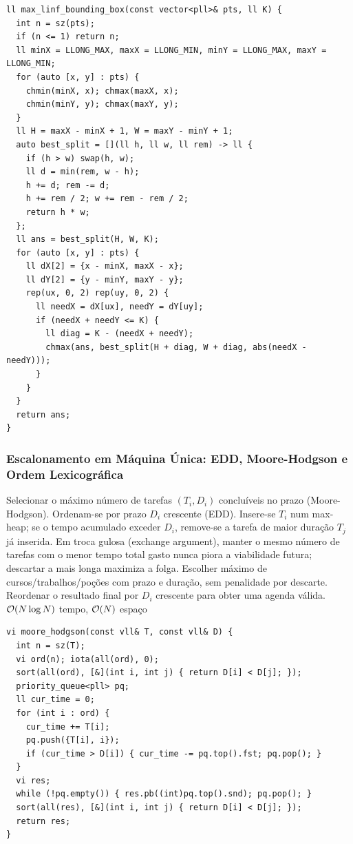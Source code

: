 \begin{lstlisting}
ll max_linf_bounding_box(const vector<pll>& pts, ll K) {
  int n = sz(pts);
  if (n <= 1) return n;
  ll minX = LLONG_MAX, maxX = LLONG_MIN, minY = LLONG_MAX, maxY = LLONG_MIN;
  for (auto [x, y] : pts) {
    chmin(minX, x); chmax(maxX, x);
    chmin(minY, y); chmax(maxY, y);
  }
  ll H = maxX - minX + 1, W = maxY - minY + 1;
  auto best_split = [](ll h, ll w, ll rem) -> ll {
    if (h > w) swap(h, w);
    ll d = min(rem, w - h);
    h += d; rem -= d;
    h += rem / 2; w += rem - rem / 2;
    return h * w;
  };
  ll ans = best_split(H, W, K);
  for (auto [x, y] : pts) {
    ll dX[2] = {x - minX, maxX - x};
    ll dY[2] = {y - minY, maxY - y};
    rep(ux, 0, 2) rep(uy, 0, 2) {
      ll needX = dX[ux], needY = dY[uy];
      if (needX + needY <= K) {
        ll diag = K - (needX + needY);
        chmax(ans, best_split(H + diag, W + diag, abs(needX - needY)));
      }
    }
  }
  return ans;
}
\end{lstlisting}

\subsubsection{Escalonamento em Máquina Única: EDD, Moore-Hodgson e Ordem Lexicográfica}
\algobox
  {Selecionar o máximo número de tarefas $(T_i, D_i)$ concluíveis no prazo (Moore-Hodgson).}
  {Ordenam-se por prazo $D_i$ crescente (EDD). Insere-se $T_i$ num max-heap; se o tempo acumulado exceder $D_i$, remove-se a tarefa de maior duração $T_j$ já inserida.}
  {Em troca gulosa (exchange argument), manter o mesmo número de tarefas com o menor tempo total gasto nunca piora a viabilidade futura; descartar a mais longa maximiza a folga.}
  {Escolher máximo de cursos/trabalhos/poções com prazo e duração, sem penalidade por descarte.}
  {Reordenar o resultado final por $D_i$ crescente para obter uma agenda válida.}
  {$\mathcal{O}(N \log N)$ tempo, $\mathcal{O}(N)$ espaço}

\begin{lstlisting}
vi moore_hodgson(const vll& T, const vll& D) {
  int n = sz(T);
  vi ord(n); iota(all(ord), 0);
  sort(all(ord), [&](int i, int j) { return D[i] < D[j]; });
  priority_queue<pll> pq;
  ll cur_time = 0;
  for (int i : ord) {
    cur_time += T[i];
    pq.push({T[i], i});
    if (cur_time > D[i]) { cur_time -= pq.top().fst; pq.pop(); }
  }
  vi res;
  while (!pq.empty()) { res.pb((int)pq.top().snd); pq.pop(); }
  sort(all(res), [&](int i, int j) { return D[i] < D[j]; });
  return res;
}
\end{lstlisting}

